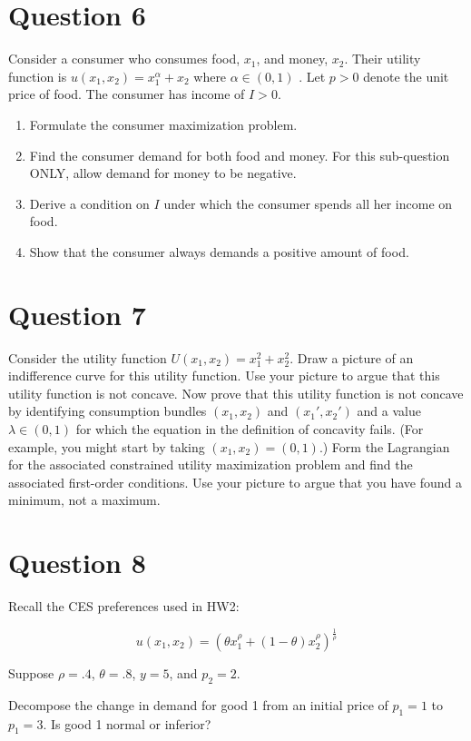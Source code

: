\documentclass{article}
\begin{document}
\section*{Question 6}
Consider a consumer who consumes food, $x_1$, and money, $x_2$. Their utility function is $u(x_1, x_2) = x_1^{\alpha} + x_2$ where $\alpha\in(0,1)$ . Let $p>0$ denote the unit price of food. The consumer has income of $I>0$.
\begin{enumerate}
\item  Formulate the consumer maximization problem.
\item  Find the consumer demand for both food and money. For this sub-question ONLY, allow demand for money to be negative.
\item Derive a condition on $I$ under which the consumer spends
all her income on food.
\item Show that the consumer
always demands a positive amount of food.
\end{enumerate}

\section*{Question 7}
Consider the utility function $U(x_1,x_2)=x_1^2+x_2^2$.  Draw a picture of an indifference curve for this utility function.  Use your picture to argue that this utility function is not concave.  Now prove that this utility function is not concave by identifying consumption bundles $(x_1,x_2)$ and $(x_1',x_2')$ and a value $\lambda\in(0,1)$ for which the equation in the definition of concavity fails.  (For example, you might start by taking $(x_1,x_2)=(0,1)$.)  Form the Lagrangian for the associated constrained utility maximization problem and find the associated first-order conditions.  Use your picture to argue that you have found a minimum, not a maximum.

\section*{Question 8}
Recall the CES preferences used in HW2:

\[
u(x_1, x_2) = \left(\theta x_1^{\rho} + (1-\theta) x_2^{\rho}\right)^{\frac1{\rho}}
\]

Suppose $\rho = .4$, $\theta = .8$, $y = 5$, and $p_2 = 2$.

Decompose the change in demand for good 1 from an initial price of $p_1 = 1$ to $p_1 = 3$. Is good 1 normal or inferior?
\end{document}

